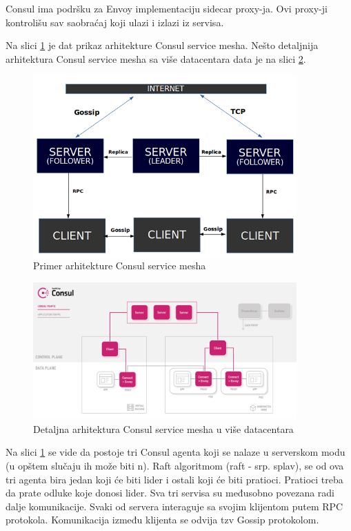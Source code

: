 \documentclass[a4paper,12pt]{report}
\begin{document}
Consul ima podršku za Envoy implementaciju sidecar proxy-ja.  Ovi proxy-ji kontrolišu sav saobraćaj koji ulazi i izlazi iz servisa. \newline

Na slici \ref{fig:consul-architecture} je dat prikaz arhitekture Consul service mesha. Nešto detaljnija arhitektura Consul service mesha sa više datacentara data je na slici \ref{fig:detailed-consul-architecture}. \newline

\begin{figure}[h]
    \centering
    \includegraphics[width=0.9\textwidth]{consul_architecture.jpg}
    \caption{Primer arhitekture Consul service mesha}
    \label{fig:consul-architecture}
\end{figure} 

\begin{figure}[h]
    \centering
    \includegraphics[width=0.9\textwidth]{consul_architecture}
    \caption{Detaljna arhitektura Consul service mesha u više datacentara}
    \label{fig:detailed-consul-architecture}
\end{figure} 

Na slici \ref{fig:consul-architecture} se vide da postoje tri Consul agenta koji se nalaze u serverskom modu (u opštem slučaju ih može biti n). Raft algoritmom (raft - srp. splav), se od ova tri agenta bira jedan koji će biti lider i ostali koji će biti pratioci. Pratioci treba da prate odluke koje donosi lider. Sva tri servisa su međusobno povezana radi dalje komunikacije. Svaki od servera interaguje sa svojim klijentom putem RPC protokola. Komunikacija između klijenta se odvija tzv Gossip protokolom. \newline
\end{document}
